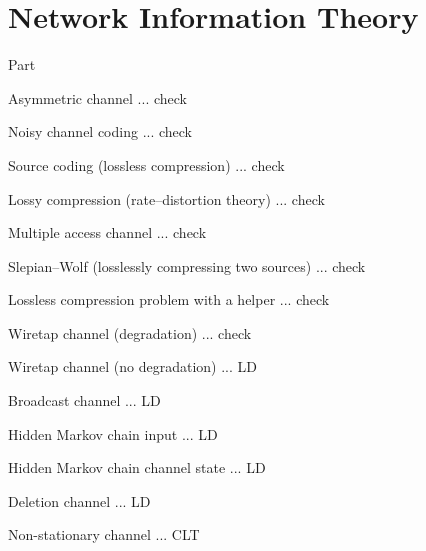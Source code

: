 \documentclass[12pt, aspectratio=1610]{beamer}
\begin{document}
\part{Network Information Theory}


\begin{frame}
	\centering
	Part \insertromanpartnumber
	
	\color{structure.fg}
	\insertpart
\end{frame}


\begin{frame}
	Asymmetric channel ... check

	Noisy channel coding ... check

	Source coding (lossless compression) ... check

	Lossy compression (rate--distortion theory) ... check

	Multiple access channel ... check

	Slepian--Wolf (losslessly compressing two sources) ... check

	Lossless compression problem with a helper ... check

	Wiretap channel (degradation) ... check
\end{frame}

\begin{frame}
	Wiretap channel (no degradation) ... LD
	
	Broadcast channel ... LD

	Hidden Markov chain input ... LD

	Hidden Markov chain channel state ... LD

	Deletion channel ... LD

	Non-stationary channel ... CLT
\end{frame}
\end{document}
